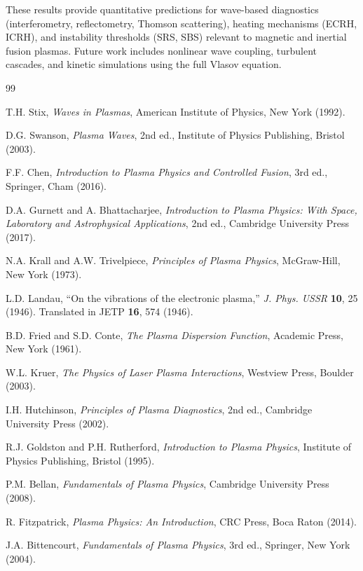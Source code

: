 \documentclass[11pt,a4paper]{article}
\begin{document}
These results provide quantitative predictions for wave-based diagnostics (interferometry, reflectometry, Thomson scattering), heating mechanisms (ECRH, ICRH), and instability thresholds (SRS, SBS) relevant to magnetic and inertial fusion plasmas. Future work includes nonlinear wave coupling, turbulent cascades, and kinetic simulations using the full Vlasov equation.

\begin{thebibliography}{99}

T.H. Stix, \textit{Waves in Plasmas}, American Institute of Physics, New York (1992).

D.G. Swanson, \textit{Plasma Waves}, 2nd ed., Institute of Physics Publishing, Bristol (2003).

F.F. Chen, \textit{Introduction to Plasma Physics and Controlled Fusion}, 3rd ed., Springer, Cham (2016).

D.A. Gurnett and A. Bhattacharjee, \textit{Introduction to Plasma Physics: With Space, Laboratory and Astrophysical Applications}, 2nd ed., Cambridge University Press (2017).

N.A. Krall and A.W. Trivelpiece, \textit{Principles of Plasma Physics}, McGraw-Hill, New York (1973).

L.D. Landau, ``On the vibrations of the electronic plasma,'' \textit{J. Phys. USSR} \textbf{10}, 25 (1946). Translated in JETP \textbf{16}, 574 (1946).

B.D. Fried and S.D. Conte, \textit{The Plasma Dispersion Function}, Academic Press, New York (1961).

W.L. Kruer, \textit{The Physics of Laser Plasma Interactions}, Westview Press, Boulder (2003).

I.H. Hutchinson, \textit{Principles of Plasma Diagnostics}, 2nd ed., Cambridge University Press (2002).

R.J. Goldston and P.H. Rutherford, \textit{Introduction to Plasma Physics}, Institute of Physics Publishing, Bristol (1995).

P.M. Bellan, \textit{Fundamentals of Plasma Physics}, Cambridge University Press (2008).

R. Fitzpatrick, \textit{Plasma Physics: An Introduction}, CRC Press, Boca Raton (2014).

J.A. Bittencourt, \textit{Fundamentals of Plasma Physics}, 3rd ed., Springer, New York (2004).


\end{thebibliography}
\end{document}
